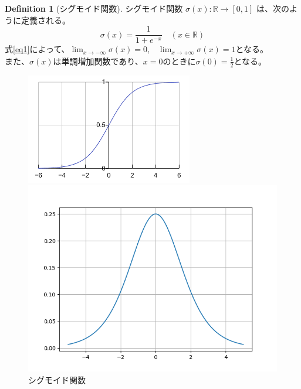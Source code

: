 \documentclass[a4paper]{jsarticle}
\theoremstyle{definition}
\newtheorem{dfn}{Definition}
\begin{document}
\begin{dfn}[シグモイド関数]
シグモイド関数 $\sigma(x):\mathbb{R}\to [0,1] $ は、次のように定義される。
\begin{equation}
  \sigma(x) = \frac{1}{1 + e^{-x}} \quad (x \in \mathbb{R})\label{eq1}
\end{equation}
式\eqref{eq1}によって、$\displaystyle\lim_{x\to -\infty}\sigma(x)=0$,$\quad\displaystyle\lim_{x\to +\infty}\sigma(x)=1$となる。\\
また、$\sigma(x)$は単調増加関数であり、$x=0$のときに$\sigma(0)=\frac{1}{2}$となる。\\
\begin{figure}[h]
  \centering
  \begin{minipage}{0.43\columnwidth}
    \centering
    \includegraphics[width=\columnwidth]{pics/p1.2.png}
    \caption{シグモイド関数}
    \label{fig:p1}
  \end{minipage}
  \hspace{5mm}
  \begin{minipage}{0.43\columnwidth}
    \centering
    \includegraphics[width=\columnwidth]{pics/p1.1.png}

\end{minipage}
\end{figure}
\end{dfn}
\end{document}

